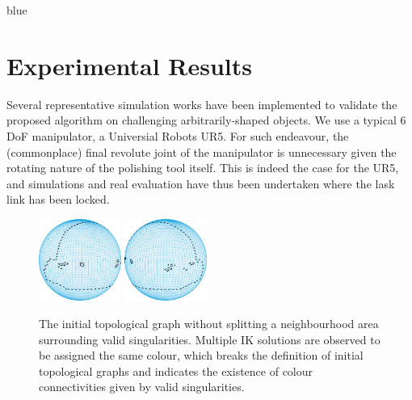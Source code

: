 \documentclass[Afour,sageh,times]{sagej}
\begin{document}
\begin{color}{blue}

\section{Experimental Results}\label{section_exp}
Several representative simulation works have been implemented to validate the proposed algorithm on challenging arbitrarily-shaped objects. 
We use a typical 6 DoF manipulator, a Universial Robots UR5. 
For such endeavour, the (commonplace) final revolute joint of the manipulator is unnecessary given the rotating nature of the polishing tool itself. This is indeed the case for the UR5, and simulations and real evaluation have thus been undertaken where the lask link has been locked. 
\end{color}

\begin{figure}[t]
\centering
\includegraphics[width = 0.24\textwidth]{figures/real_world/whole_graph_left}
\includegraphics[width = 0.24\textwidth]{figures/real_world/whole_graph_right}
\caption{The initial topological graph without splitting a neighbourhood area surrounding valid singularities. 
Multiple IK solutions are observed to be assigned the same colour, which breaks the definition of initial topological graphs and indicates the existence of colour connectivities given by valid singularities. }\label{fig:whole_graph}
\end{figure}
\end{document}

